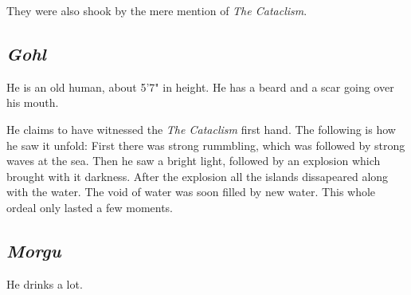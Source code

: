 \documentclass{article}
\begin{document}
\begin{multicols}{2}
    They were also shook by the mere mention of \textit{The Cataclism}.

    \subsection{\textit{Gohl}}

    He is an old human, about 5'7" in height. He has a beard and a scar going over his mouth.

    He claims to have witnessed the \textit{The Cataclism} first hand. The following is how he saw it unfold:
    First there was strong rummbling, which was followed by strong waves at the sea. Then he saw a bright light, followed by an explosion which brought with it darkness. After the explosion all the islands
    dissapeared along with the water. The void of water was soon filled by new water.
    This whole ordeal only lasted a few moments.

    \subsection{\textit{Morgu}}

    He drinks a lot.


\end{multicols}
\end{document}
